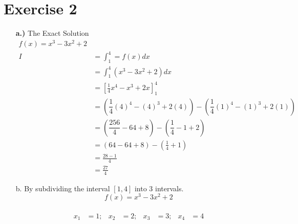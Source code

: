 \documentclass[a4paper,12pt]{article}
\begin{document}
\section{\textbf{Exercise 2}}
\begin{itemize}
\item[\textbf{a.)}] The Exact Solution
\begin{align*}
f\left( x\right) = x^{3} - 3x^{2} + 2\\
I &=  \int_{1}^{4} = f\left( x\right) dx\\
&= \int_{1}^{4}\left(   x^{3} - 3x^{2} + 2\right)  dx\\
&= \left[ \frac{1}{4} x^{4} - x^{3} + 2x \right]_{1}^{4} \\
&= \left( \dfrac{1}{4}\left( 4\right)^{4} - \left( 4\right)^{3} +  2\left( 4\right) \right) - \left( \dfrac{1}{4}\left( 1\right)^{4} - \left( 1\right)^{3} +  2\left( 1\right) \right)\\  
&= \left( \dfrac{256}{4}-64 +8 \right) -  \left( \dfrac{1}{4}- 1 + 2 \right)\\
&= \left( 64 - 64 + 8 \right) - \left( \frac{1}{4} + 1\right) \\ 
&= \frac{28-1}{4}\\
&= \frac{27}{4}
\end{align*}
\item[b.] By subdividing the interval $[1,4]$
 into $3$ intervals.\\
$$f\left( x\right) = x^{3} - 3x^{2} + 2$$
\\
\begin{align*}
x_1&=1; & x_2&=2; & x_3&=3; & x_4&=4\\
\end{align*}


\end{itemize}
\end{document}
